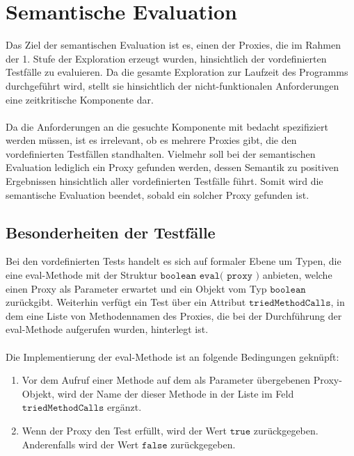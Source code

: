 \section{Semantische Evaluation}
Das Ziel der semantischen Evaluation ist es, einen der Proxies, die im Rahmen der 1. Stufe der Exploration erzeugt wurden, hinsichtlich der vordefinierten Testfälle zu evaluieren. Da die gesamte Exploration zur Laufzeit des Programms durchgeführt wird, stellt sie hinsichtlich der nicht-funktionalen Anforderungen eine zeitkritische Komponente dar.
\\\\
Da die Anforderungen an die gesuchte Komponente mit bedacht spezifiziert werden müssen, ist es irrelevant, ob es mehrere Proxies gibt, die den vordefinierten Testfällen standhalten. Vielmehr soll bei der semantischen Evaluation lediglich ein Proxy gefunden werden, dessen Semantik zu positiven Ergebnissen hinsichtlich aller vordefinierten Testfälle führt. Somit wird die semantische Evaluation beendet, sobald ein solcher Proxy gefunden ist.
\subsection{Besonderheiten der Testfälle}
Bei den vordefinierten Tests handelt es sich auf formaler Ebene um Typen, die eine eval-Methode mit der Struktur $\texttt{boolean eval( proxy )}$ anbieten, welche einen Proxy als Parameter erwartet und ein Objekt vom Typ $\texttt{boolean}$ zurückgibt. Weiterhin verfügt ein Test über ein Attribut $\texttt{triedMethodCalls}$, in dem eine Liste von Methodennamen des Proxies, die bei der Durchführung der eval-Methode aufgerufen wurden, hinterlegt ist.
\\\\
Die Implementierung der eval-Methode ist an folgende Bedingungen geknüpft:
\begin{enumerate}
\item Vor dem Aufruf einer Methode auf dem als Parameter übergebenen Proxy-Objekt, wird der Name der dieser Methode in der Liste im Feld $\texttt{triedMethodCalls}$ ergänzt.
\item Wenn der Proxy den Test erfüllt, wird der Wert $\texttt{true}$ zurückgegeben. Anderenfalls wird der Wert $\texttt{false}$ zurückgegeben.
\end{enumerate}

